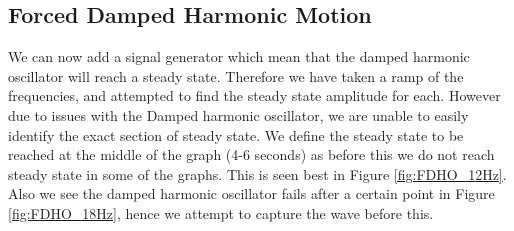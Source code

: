 \subsection{Forced Damped Harmonic Motion} \label{sec:FDHO}

We can now add a signal generator which mean that the damped harmonic oscillator will reach a steady state. Therefore we have taken a ramp of the frequencies, and attempted to find the steady state amplitude for each. However due to issues with the Damped harmonic oscillator, we are unable to easily identify the exact section of steady state. We define the steady state to be reached at the middle of the graph (4-6 seconds) as before this we do not reach steady state in some of the graphs. This is seen best in Figure \ref{fig:FDHO_12Hz}. Also we see the damped harmonic oscillator fails after a certain point in Figure \ref{fig:FDHO_18Hz}, hence we attempt to capture the wave before this. 


